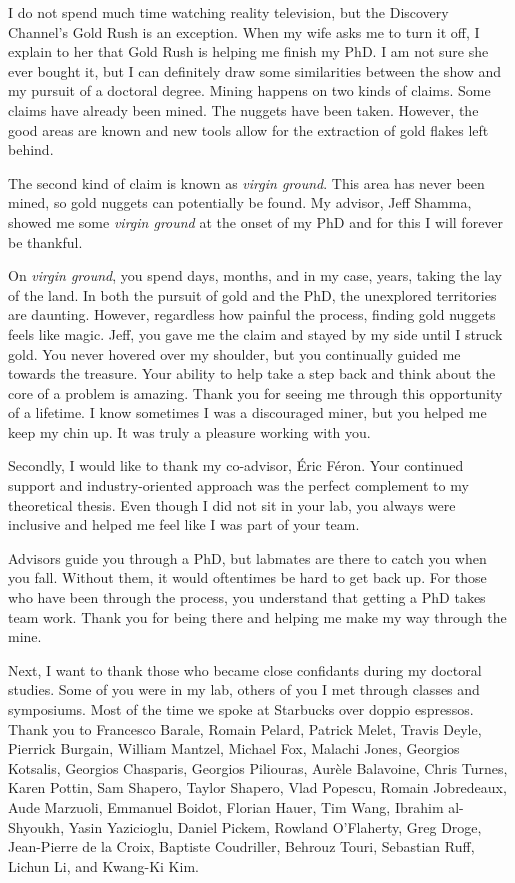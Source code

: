 I do not spend much time watching reality television, but the Discovery Channel's Gold Rush is an exception.
When my wife asks me to turn it off, I explain to her that Gold Rush is helping me finish my PhD.
I am not sure she ever bought it, but I can definitely draw some similarities between the show and my pursuit of a doctoral degree.
Mining happens on two kinds of claims.
Some claims have already been mined.
The nuggets have been taken.
However, the good areas are known and new tools allow for the extraction of gold flakes left behind.

The second kind of claim is known as \emph{virgin ground}.
This area has never been mined, so gold nuggets can potentially be found.
My advisor, Jeff Shamma, showed me some \emph{virgin ground} at the onset of my PhD and for this I will forever be thankful.

On \emph{virgin ground}, you spend days, months, and in my case, years, taking the lay of the land.
In both the pursuit of gold and the PhD, the unexplored territories are daunting.
However, regardless how painful the process, finding gold nuggets feels like magic.
Jeff, you gave me the claim and stayed by my side until I struck gold.
You never hovered over my shoulder, but you continually guided me towards the treasure.
Your ability to help take a step back and think about the core of a problem is amazing.
Thank you for seeing me through this opportunity of a lifetime.
I know sometimes I was a discouraged miner, but you helped me keep my chin up.
It was truly a pleasure working with you.

Secondly, I would like to thank my co-advisor, Éric Féron.
Your continued support and industry-oriented approach was the perfect complement to my theoretical thesis.
Even though I did not sit in your lab, you always were inclusive and helped me feel like I was part of your team.

Advisors guide you through a PhD, but labmates are there to catch you when you fall.
Without them, it would oftentimes be hard to get back up.
For those who have been through the process, you understand that getting a PhD takes team work.
Thank you for being there and helping me make my way through the mine.

Next, I want to thank those who became close confidants during my doctoral studies.
Some of you were in my lab, others of you I met through classes and symposiums.
Most of the time we spoke at Starbucks over doppio espressos.
Thank you to Francesco Barale, Romain Pelard, Patrick Melet, Travis Deyle, Pierrick Burgain, William Mantzel, Michael Fox, Malachi Jones, Georgios Kotsalis, Georgios Chasparis, Georgios Piliouras, Aurèle Balavoine, Chris Turnes, Karen Pottin, Sam Shapero, Taylor Shapero, Vlad Popescu, Romain Jobredeaux, Aude Marzuoli, Emmanuel Boidot, Florian Hauer, Tim Wang, Ibrahim al-Shyoukh, Yasin Yazicioglu, Daniel Pickem, Rowland O'Flaherty, Greg Droge, Jean-Pierre de la Croix, Baptiste Coudriller, Behrouz Touri, Sebastian Ruff, Lichun Li, and Kwang-Ki Kim.

